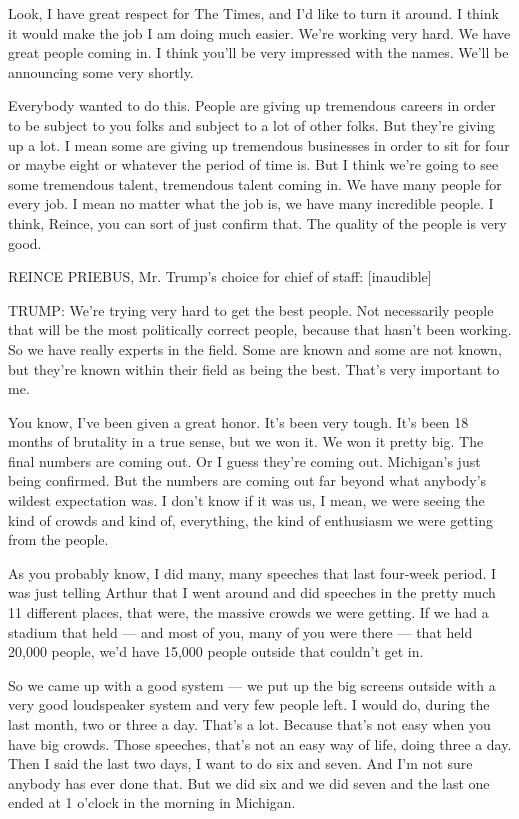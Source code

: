 Look, I have great respect for The Times, and I'd like to turn it
around. I think it would make the job I am doing much easier. We're
working very hard. We have great people coming in. I think you'll be
very impressed with the names. We'll be announcing some very shortly.

Everybody wanted to do this. People are giving up tremendous careers in
order to be subject to you folks and subject to a lot of other folks.
But they're giving up a lot. I mean some are giving up tremendous
businesses in order to sit for four or maybe eight or whatever the
period of time is. But I think we're going to see some tremendous
talent, tremendous talent coming in. We have many people for every job.
I mean no matter what the job is, we have many incredible people. I
think, Reince, you can sort of just confirm that. The quality of the
people is very good.

REINCE PRIEBUS, Mr. Trump's choice for chief of staff: {[}inaudible{]}

TRUMP: We're trying very hard to get the best people. Not necessarily
people that will be the most politically correct people, because that
hasn't been working. So we have really experts in the field. Some are
known and some are not known, but they're known within their field as
being the best. That's very important to me.

You know, I've been given a great honor. It's been very tough. It's been
18 months of brutality in a true sense, but we won it. We won it pretty
big. The final numbers are coming out. Or I guess they're coming out.
Michigan's just being confirmed. But the numbers are coming out far
beyond what anybody's wildest expectation was. I don't know if it was
us, I mean, we were seeing the kind of crowds and kind of, everything,
the kind of enthusiasm we were getting from the people.

As you probably know, I did many, many speeches that last four-week
period. I was just telling Arthur that I went around and did speeches in
the pretty much 11 different places, that were, the massive crowds we
were getting. If we had a stadium that held --- and most of you, many of
you were there --- that held 20,000 people, we'd have 15,000 people
outside that couldn't get in.

So we came up with a good system --- we put up the big screens outside
with a very good loudspeaker system and very few people left. I would
do, during the last month, two or three a day. That's a lot. Because
that's not easy when you have big crowds. Those speeches, that's not an
easy way of life, doing three a day. Then I said the last two days, I
want to do six and seven. And I'm not sure anybody has ever done that.
But we did six and we did seven and the last one ended at 1 o'clock in
the morning in Michigan.

